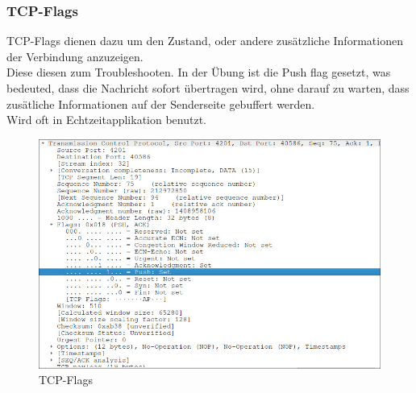 \documentclass[a4paper]{article}
\begin{document}
\subsubsection{TCP-Flags}
TCP-Flags dienen dazu um den Zustand, oder andere zusätzliche Informationen der Verbindung anzuzeigen.\\
Diese diesen zum Troubleshooten.
In der Übung ist die Push flag gesetzt, was bedeuted, dass die Nachricht sofort übertragen wird, ohne darauf zu warten, dass zusätliche Informationen auf der Senderseite gebuffert werden.
\\ Wird oft in Echtzeitapplikation benutzt.
\begin{figure}[h]
	\includegraphics[scale=0.5]{images/tcp-flags.jpeg}
	\caption{TCP-Flags}
\end{figure}
\newpage
\end{document}

